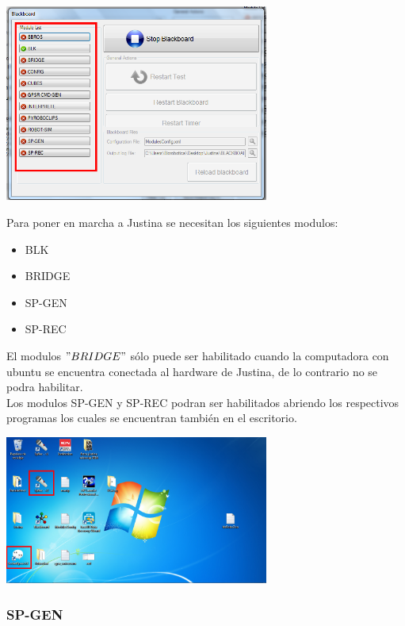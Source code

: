 \documentclass[user_manual.tex]{subfiles}
\begin{document}
\begin{center}
\includegraphics[width=0.65\textwidth]{Figures/Puesta_marcha/Modulos_Bb.png}
\end{center}

Para poner en marcha a Justina se necesitan los siguientes modulos:

\begin{itemize}
\item BLK
\item BRIDGE
\item SP-GEN
\item SP-REC
\end{itemize}

El modulos $"BRIDGE"$ sólo puede ser habilitado cuando la computadora con ubuntu se encuentra conectada al hardware de Justina, de lo contrario no se podra habilitar.\\

Los modulos SP-GEN y SP-REC podran ser habilitados abriendo los respectivos programas los cuales se encuentran también en el escritorio.

\begin{center}
\includegraphics[width=0.65\textwidth]{Figures/Puesta_marcha/SpRec_SpGen.png}
\end{center}


\subsubsection{SP-GEN}
\end{document}
